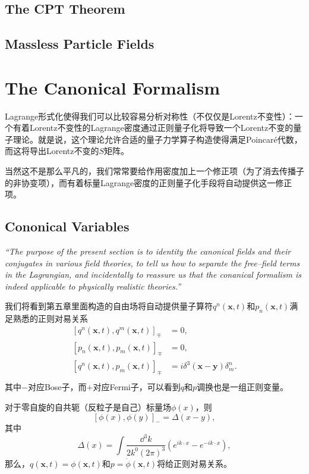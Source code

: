 \documentclass[9pt]{extbook}
\theoremstyle{plain}%
\newcommand{\re}[1]
	{\begin{center}
		\colorbox{shadecolor}{
		\begin{minipage}{135mm}
				\emph{``#1''}
			\end{minipage}}
	\end{center}}
\begin{document}
\section{The CPT Theorem}

\section{Massless Particle Fields}
\addtocounter{chapter}{1}
\chapter{The Canonical Formalism}
Lagrange形式化使得我们可以比较容易分析对称性（不仅仅是Lorentz不变性）：一个有着Lorentz不变性的Lagrange密度通过正则量子化将导致一个Lorentz不变的量子理论。就是说，这个理论允许合适的量子力学算子构造使得满足Poincar\'{e}代数，而这将导出Lorentz不变的$S$矩阵。

当然这不是那么平凡的，我们常常要给作用密度加上一个修正项（为了消去传播子的非协变项），而有着标量Lagrange密度的正则量子化手段将自动提供这一修正项。

\section{Cononical Variables}
\re{The purpose of the present section is to identity the canonical fields and their conjugates in various field theories, to tell us how to separate the free--field terms in the Lagrangian, and incidentally to reassure us that the conanical formalism is indeed applicable to physically realistic theories.}

我们将看到第五章里面构造的自由场将自动提供量子算符$q^n(\mathbf{x},t)$和$p_n(\mathbf{x},t)$满足熟悉的正则对易关系
\[
	\begin{split}
		[q^n(\mathbf{x},t),q^m(\mathbf{x},t)]_{\mp}&=0,\\
		[p_n(\mathbf{x},t),p_m(\mathbf{x},t)]_{\mp}&=0,\\
		[q^n(\mathbf{x},t),p_m(\mathbf{x},t)]_{\mp}&=i\delta^3(\mathbf{x}-\mathbf{y})\delta^n_m.\\
	\end{split}
\]
其中$-$对应Bose子，而$+$对应Fermi子，可以看到$q$和$p$调换也是一组正则变量。

对于零自旋的自共轭（反粒子是自己）标量场$\phi(x)$，则
\[
	[\phi(x),\phi(y)]_-=\Delta(x-y),
\]
其中
\[
	\Delta(x)=\int\frac{\dd^3 k}{2k^0 (2\pi)^3}(e^{ik\cdot x}-e^{-ik\cdot x}),
\]
那么，$q(\mathbf{x},t)=\phi(\mathbf{x},t)$和$p=\dot{\phi}(\mathbf{x},t)$将给正则对易关系。
\end{document}
